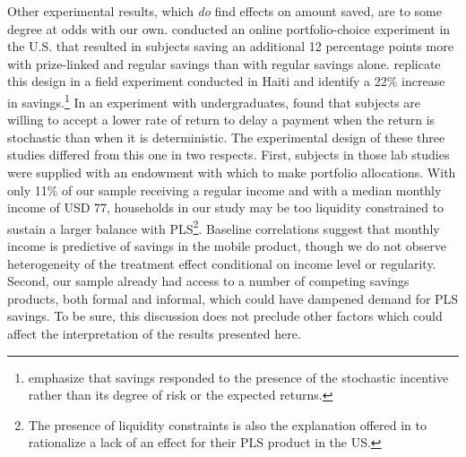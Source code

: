 \documentclass[12pt]{article}
\begin{document}
		Other experimental results, which \emph{do} find effects on amount saved, are to some degree at odds with our own. \textcite{atalay_savings_2014} conducted an online portfolio-choice experiment in the U.S. that resulted in subjects saving an additional 12 percentage points more with prize-linked and regular savings than with regular savings alone. \textcite{dizon_leveraging_2016} replicate this design in a field experiment conducted in Haiti and identify a 22\% increase in savings.\footnote{\textcite{dizon_leveraging_2016} emphasize that savings responded to the presence of the stochastic incentive rather than its degree of risk or the expected returns.} In an experiment with undergraduates, \textcite{filiz-ozbay_lottery_2015} found that subjects are willing to accept a lower rate of return to delay a payment when the return is stochastic than when it is deterministic. The experimental design of these three studies differed from this one in two respects. First, subjects in those lab studies were supplied with an endowment with which to make portfolio allocations. With only 11\% of our sample receiving a regular income and with a median monthly income of USD 77, households in our study may be too liquidity constrained to sustain a larger balance with PLS\footnote{The presence of liquidity constraints is also the explanation offered in \textcite{loibl_testing_2016} to rationalize a lack of an effect for their PLS product in the US.}. Baseline correlations suggest that monthly income is predictive of savings in the mobile product, though we do not observe heterogeneity of the treatment effect conditional on income level or regularity. Second, our sample already had access to a number of competing savings products, both formal and informal, which could have dampened demand for PLS savings. To be sure, this discussion does not preclude other factors which could affect the interpretation of the results presented here.
\end{document}

